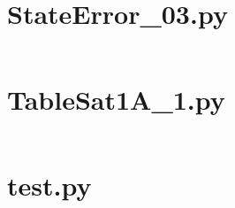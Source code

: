 \pagebreak
\section*{StateError\_03.py}\label{code:TSatPySamples/StateError_03.py}\inputminted[linenos,fontsize=\scriptsize]{python}{/home/dcouture/git/mathyourlife/TSatPy/tex/sample_scripts/StateError_03.py}

\pagebreak
\section*{TableSat1A\_1.py}\label{code:TSatPySamples/TableSat1A_1.py}\inputminted[linenos,fontsize=\scriptsize]{python}{/home/dcouture/git/mathyourlife/TSatPy/tex/sample_scripts/TableSat1A_1.py}

\pagebreak
\section*{test.py}\label{code:TSatPySamples/test.py}\inputminted[linenos,fontsize=\scriptsize]{python}{/home/dcouture/git/mathyourlife/TSatPy/tex/sample_scripts/test.py}
